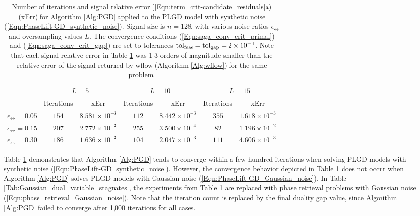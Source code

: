 \begin{table}[H]
\centering
\begin{tabular}{ |c|cc|cc|cc| }
 \hline

 	&	\multicolumn{2}{c|}{$L = 5$}
 		&	\multicolumn{2}{c|}{$L = 10$}
 			&	\multicolumn{2}{c|}{$L = 15$}	\\
 	&	 Iterations	&	xErr
 		&	Iterations	&	xErr
 			&	Iterations	&	xErr		\\  			
 \hline
$\epsilon_\rel = 0.05$
	&	$154$ & $8.581 \times 10^{-3}$
		&	$112$ & $8.442 \times 10^{-3}$
			&	$355$ & $ 1.618 \times 10^{-3}$ \\
$\epsilon_\rel = 0.15$
	&	$207$ & $2.772 \times 10^{-3}$
		&	$255$ & $3.500 \times 10^{-4}$
			&	$82$ & $1.196 \times 10^{-2} $ \\
$\epsilon_\rel = 0.30$
	&	$186$ & $1.636 \times 10^{-3}$
		&	$104$ & $2.047 \times 10^{-3}$
			&	$111$ & $4.606 \times 10^{-3}$ \\
 \hline
\end{tabular}
\caption{Number of iterations and signal relative error (\ref{Eqn:term_crit-candidate_residuals}a) (xErr) for Algorithm \ref{Alg:PGD} applied to the PLGD model with synthetic noise (\ref{Eqn:PhaseLift-GD_synthetic_noise}).  Signal size is $n=128$, with various noise ratios $\epsilon_\rel$ and oversampling values $L$.  The convergence conditions (\ref{Eqn:saga_conv_crit_primal}) and (\ref{Eqn:saga_conv_crit_gap}) are set to tolerances $\textnormal{tol}_\textnormal{feas} = \textnormal{tol}_\textnormal{gap} = 2 \times 10^{-4}$.  Note that each signal relative error in Table \ref{Tab:synthetic_dual_variable_converges} was 1-3 orders of magnitude smaller than the relative error of the signal returned by wflow (Algorithm \ref{Alg:wflow}) for the same problem.} 
\label{Tab:synthetic_dual_variable_converges}
\end{table}


Table \ref{Tab:synthetic_dual_variable_converges} demonstrates that Algorithm \ref{Alg:PGD} tends to converge within a few hundred iterations when solving PLGD models with synthetic noise (\ref{Eqn:PhaseLift-GD_synthetic_noise}).  However, the convergence behavior depicted in Table \ref{Tab:synthetic_dual_variable_converges} does not occur when Algorithm \ref{Alg:PGD} solves PLGD models with Gaussian noise (\ref{Eqn:PhaseLift-GD_Gaussian_noise}).  In Table \ref{Tab:Gaussian_dual_variable_stagnates}, the experiments from Table \ref{Tab:synthetic_dual_variable_converges} are replaced with phase retrieval problems with Gaussian noise (\ref{Eqn:phase_retrieval_Gaussian_noise}).  Note that the iteration count is replaced by the final duality gap value, since Algorithm \ref{Alg:PGD} failed to converge after 1,000 iterations for all cases.


